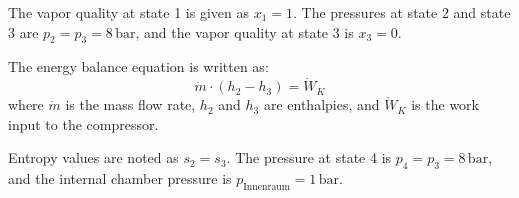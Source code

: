 The vapor quality at state 1 is given as \( x_1 = 1 \).  
The pressures at state 2 and state 3 are \( p_2 = p_3 = 8 \, \text{bar} \), and the vapor quality at state 3 is \( x_3 = 0 \).  

The energy balance equation is written as:  
\[
\dot{m} \cdot (h_2 - h_3) = \dot{W}_K
\]  
where \( \dot{m} \) is the mass flow rate, \( h_2 \) and \( h_3 \) are enthalpies, and \( \dot{W}_K \) is the work input to the compressor.  

Entropy values are noted as \( s_2 = s_3 \).  
The pressure at state 4 is \( p_4 = p_3 = 8 \, \text{bar} \), and the internal chamber pressure is \( p_{\text{Innenraum}} = 1 \, \text{bar} \).